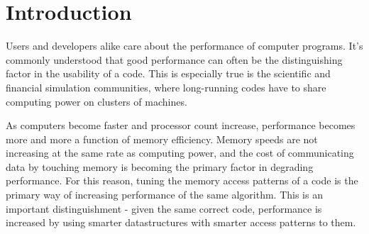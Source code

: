 \documentclass[annual]{acmsiggraph}
\begin{document}

\section{Introduction}
  
% 
  
  Users and developers alike care about the performance of computer programs. It's commonly understood that good performance can often be the distinguishing factor in the usability of a code. This is especially true is the scientific and financial simulation communities, where long-running codes have to share computing power on clusters of machines.
  
  As computers become faster and processor count increase, performance becomes more and more a function of memory efficiency. Memory speeds are not increasing at the same rate as computing power, and the cost of communicating data by touching memory is becoming the primary factor in degrading performance. For this reason, tuning the memory access patterns of a code is the primary way of increasing performance of the same algorithm. This is an important distinguishment - given the same correct code, performance is increased by using smarter datastructures with smarter access patterns to them.
  
\end{document}
